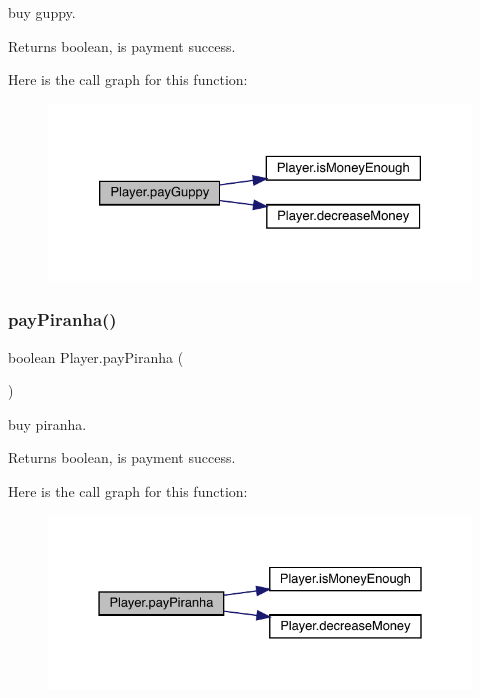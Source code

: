 buy guppy. \begin{DoxyReturn}{Returns}
boolean, is payment success. 
\end{DoxyReturn}
Here is the call graph for this function\+:
\nopagebreak
\begin{figure}[H]
\begin{center}
\leavevmode
\includegraphics[width=326pt]{class_player_ae1169535a36bb44c7e37af0c7cf75410_cgraph}
\end{center}
\end{figure}
\mbox{\label{class_player_aa46852c65ff869246dd5ae918e2b8683}} 
\subsubsection{\texorpdfstring{pay\+Piranha()}{payPiranha()}}
{\footnotesize\ttfamily boolean Player.\+pay\+Piranha (\begin{DoxyParamCaption}{ }\end{DoxyParamCaption})\hspace{0.3cm}{\ttfamily [inline]}}

buy piranha. \begin{DoxyReturn}{Returns}
boolean, is payment success. 
\end{DoxyReturn}
Here is the call graph for this function\+:
\nopagebreak
\begin{figure}[H]
\begin{center}
\leavevmode
\includegraphics[width=331pt]{class_player_aa46852c65ff869246dd5ae918e2b8683_cgraph}
\end{center}
\end{figure}
\mbox{\label{class_player_ae89921d6eb811215711a62d7e6520a69}} 
